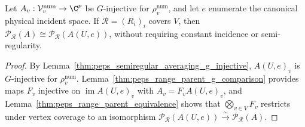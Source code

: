 \begin{lemma}%
    \label{thm:peps_semiregular_physical_canonical_parent}
    \leanok
    Let $A_v:\mathcal V_v^{\mathrm{num}}\to\C^p$ be $G$-injective
    for $\rho_v^{\mathrm{num}}$, and let $e$ enumerate the canonical
    physical incident space. If $\mathcal R=(R_i)_i$ covers $V$, then
    $\mathcal P_{\mathcal R}(A)\cong\mathcal P_{\mathcal R}(A(U,e))$, without
    requiring constant incidence or semi-regularity.
\end{lemma}
\begin{proof}\leanok
    By Lemma~\ref{thm:peps_semiregular_averaging_g_injective}, $A(U,e)_v$ is
    $G$-injective for $\rho_v^{\mathrm{num}}$. Lemma~\ref{thm:peps_range_parent_g_comparison}
    provides maps $F_v$ injective on $\operatorname{im}A(U,e)_v$ with
    $A_v=F_vA(U,e)_v$, and Lemma~\ref{thm:peps_range_parent_equivalence}
    shows that $\bigotimes_{v\in V}F_v$ restricts under vertex coverage to an
    isomorphism $\mathcal P_{\mathcal R}(A(U,e))\xrightarrow{\sim}\mathcal P_{\mathcal R}(A)$.
\end{proof}

